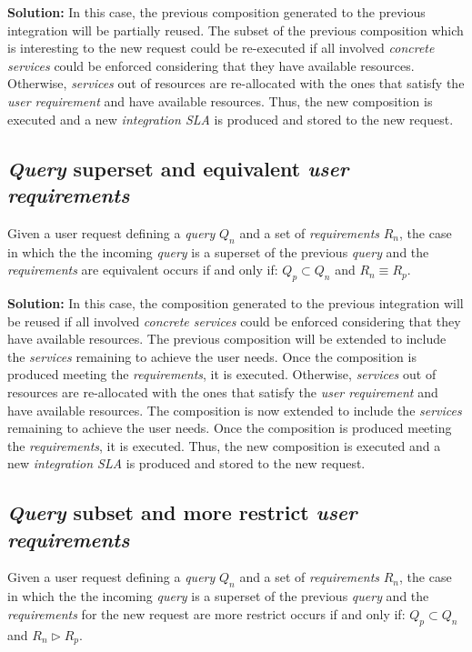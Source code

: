 \bigskip
\noindent \textbf{Solution:} In this case, the previous composition generated to the previous integration will be partially reused. The subset of the previous composition which is interesting to the new request could be re-executed if all involved \textsl{concrete services} could be enforced considering that they have available resources. Otherwise, \textsl{services} out of resources are re-allocated with the ones that satisfy the \textsl{user requirement} and have available resources. Thus, the new composition is executed and a new \textsl{integration SLA} is produced and stored to the new request.

\subsection{\textsl{Query} superset and equivalent \textsl{user requirements}}
Given a user request defining a \textsl{query} $Q_{n}$ and a set of \textsl{requirements} $R_{n}$, the case in which the the incoming \textsl{query} is a superset of the previous \textsl{query} and the \textsl{requirements} are equivalent occurs if and only if: $Q_{p} \subset Q_{n}$ and $R_{n} \equiv R_{p}$.

\bigskip
\noindent \textbf{Solution:} In this case, the composition generated to the previous integration will be reused if all involved \textsl{concrete services} could be enforced considering that they have available resources. The previous composition will be extended to include the \textsl{services} remaining to achieve the user needs. Once the composition is produced meeting the \textsl{requirements}, it is executed. Otherwise, \textsl{services} out of resources are re-allocated with the ones that satisfy the \textsl{user requirement} and have available resources. The composition is now extended to include the \textsl{services} remaining to achieve the user needs. Once the composition is produced meeting the \textsl{requirements}, it is executed. Thus, the new composition is executed and a new \textsl{integration SLA} is produced and stored to the new request.

\subsection{\textsl{Query} subset and more restrict \textsl{user requirements}}
Given a user request defining a \textsl{query} $Q_{n}$ and a set of \textsl{requirements} $R_{n}$, the case in which the the incoming \textsl{query} is a superset of the previous \textsl{query} and the \textsl{requirements} for the new request are more restrict occurs if and only if: $Q_{p} \subset Q_{n}$ and $R_{n} \triangleright R_{p}$.

